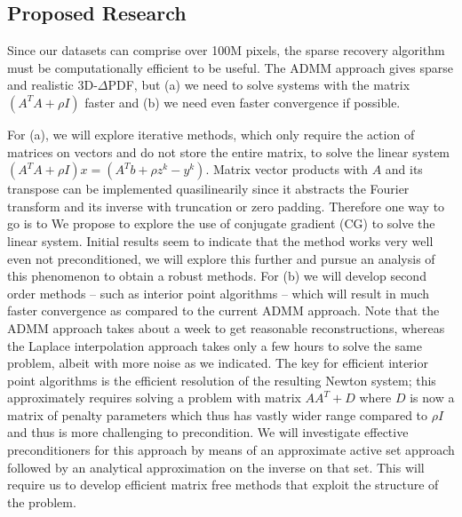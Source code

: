 \subsection{Proposed Research} \label{ss:proposed}
Since our datasets can comprise over 100M pixels, the sparse recovery algorithm must be computationally efficient to be useful. The ADMM approach gives sparse and realistic 3D-$\Delta$PDF, but (a) we need to solve systems with the matrix $\left(A^{T} A+\rho I\right)$ faster and (b) we need even faster convergence if possible.  

For (a), we will explore iterative methods, which only require the action of matrices on vectors and do not store the entire matrix, to solve the linear system $\left(A^{T} A+\rho I\right) x = \left(A^{T}  b+\rho z^{k}-y^{k}\right) $. Matrix vector products with $A$ and its transpose can be implemented quasilinearily since it abstracts the Fourier transform and its inverse with truncation or zero padding. Therefore one way to go is to 
We propose to explore the use of conjugate gradient (CG) to solve the linear system. Initial results seem to indicate that the method works very well even not preconditioned, we will explore this further and pursue an analysis of this phenomenon to obtain a robust methods.  For (b) we will develop second order methods -- such as interior point algorithms --  which will result in much faster convergence as compared to the current ADMM approach. Note that the ADMM approach takes about a week to get reasonable reconstructions, whereas the Laplace interpolation approach takes only a few hours to solve the same problem, albeit with more noise as we indicated. The key for efficient interior point algorithms is the efficient resolution of the resulting Newton system;  this approximately requires solving a problem with matrix $AA^T+D$ where $D$ is now a matrix of penalty parameters which thus has vastly wider range compared to $\rho I$ and thus is more challenging to precondition. We will investigate effective preconditioners for this approach by means of an approximate active set approach followed by an analytical approximation on the inverse on that set. This will require us to develop efficient matrix free methods that exploit the structure of the problem.



